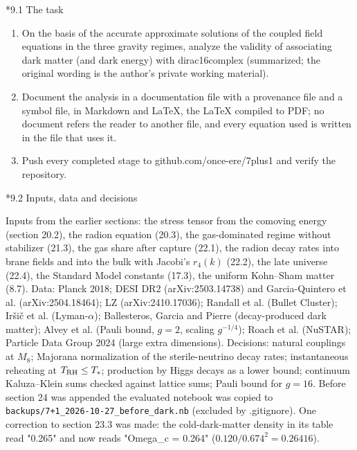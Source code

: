 \documentclass[10pt,a4paper]{article}
\makeatletter
\renewcommand\subsection{\@startsection{subsection}{2}{\z@}{-3.25ex\@plus -1ex \@minus -.2ex}{1.5ex \@plus .2ex}{\normalfont\large\bfseries\raggedright}}
\makeatother
\begin{document}
\subsection*{9.1 The task}
\begin{enumerate}
\item On the basis of the accurate approximate solutions of the coupled field equations in the three gravity regimes, analyze the validity of associating dark matter (and dark energy) with dirac16complex (summarized; the original wording is the author’s private working material).
\item Document the analysis in a documentation file with a provenance file and a symbol file, in Markdown and LaTeX, the LaTeX compiled to PDF; no document refers the reader to another file, and every equation used is written in the file that uses it.
\item Push every completed stage to github.com/once-ere/7plus1 and verify the repository.
\end{enumerate}
\subsection*{9.2 Inputs, data and decisions}
Inputs from the earlier sections: the stress tensor from the comoving energy (section 20.2), the radion equation (20.3), the gas-dominated regime without stabilizer (21.3), the gas share after capture (22.1), the radion decay rates into brane fields and into the bulk with Jacobi’s $r_4(k)$ (22.2), the late universe (22.4), the Standard Model constants (17.3), the uniform Kohn–Sham matter (8.7). Data: Planck 2018; DESI DR2 (arXiv:2503.14738) and Garcia-Quintero et al. (arXiv:2504.18464); LZ (arXiv:2410.17036); Randall et al. (Bullet Cluster); Iršič et al. (Lyman-$\alpha$); Ballesteros, Garcia and Pierre (decay-produced dark matter); Alvey et al. (Pauli bound, $g=2$, scaling $g^{-1/4}$); Roach et al. (NuSTAR); Particle Data Group 2024 (large extra dimensions). Decisions: natural couplings at $M_8$; Majorana normalization of the sterile-neutrino decay rates; instantaneous reheating at $T_{\rm RH}\le T_*$; production by Higgs decays as a lower bound; continuum Kaluza–Klein sums checked against lattice sums; Pauli bound for $g=16$. Before section 24 was appended the evaluated notebook was copied to \texttt{backups/\allowbreak{}7+1\_\allowbreak{}2026-10-27\_\allowbreak{}before\_\allowbreak{}dark.nb} (excluded by .gitignore). One correction to section 23.3 was made: the cold-dark-matter density in its table read "0.265" and now reads "Omega\_c = 0.264" ($0.120/0.674^2=0.26416$).
\end{document}
